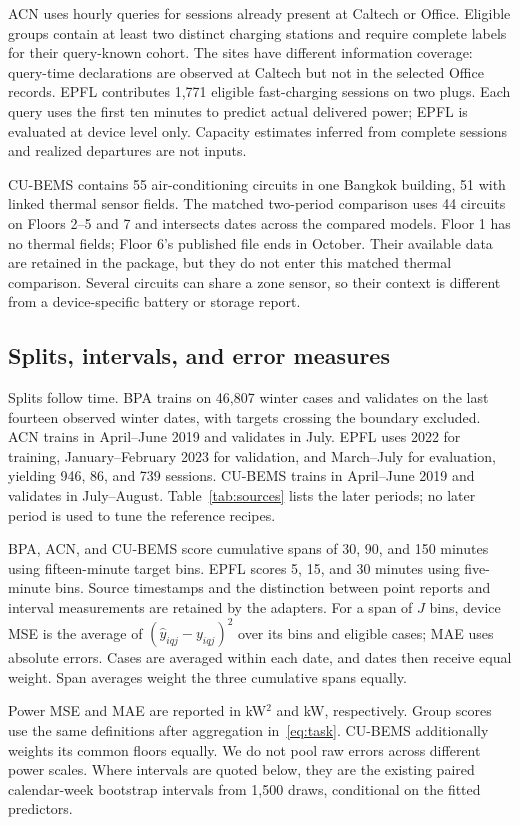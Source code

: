 \documentclass[conference,a4paper]{IEEEtran}
\begin{document}
ACN uses hourly queries for sessions already present at Caltech or Office.
Eligible groups contain at least two distinct charging stations and require
complete labels for their query-known cohort. The sites have different
information coverage: query-time declarations are observed at Caltech but
not in the selected Office records. EPFL contributes 1,771 eligible
fast-charging sessions on two plugs. Each query uses the first ten minutes
to predict actual delivered power; EPFL is evaluated at device level only.
Capacity estimates inferred from complete sessions and realized departures
are not inputs.

CU-BEMS contains 55 air-conditioning circuits in one Bangkok building, 51
with linked thermal sensor fields. The matched two-period comparison uses
44 circuits on Floors 2--5 and 7 and intersects dates across the compared
models. Floor 1 has no thermal fields; Floor 6's published file ends in
October. Their available data are retained in the package, but they do not
enter this matched thermal comparison. Several circuits can share a zone
sensor, so their context is different from a device-specific battery or
storage report.

\subsection{Splits, intervals, and error measures}
Splits follow time. BPA trains on 46,807 winter cases and validates on the
last fourteen observed winter dates, with targets crossing the boundary
excluded. ACN trains in April--June 2019 and validates in July. EPFL uses
2022 for training, January--February 2023 for validation, and March--July
for evaluation, yielding 946, 86, and 739 sessions. CU-BEMS trains in
April--June 2019 and validates in July--August. Table~\ref{tab:sources}
lists the later periods; no later period is used to tune the reference recipes.

BPA, ACN, and CU-BEMS score cumulative spans of 30, 90, and 150 minutes
using fifteen-minute target bins. EPFL scores 5, 15, and 30 minutes using
five-minute bins. Source timestamps and the distinction between point
reports and interval measurements are retained by the adapters. For a span
of $J$ bins, device MSE is the average of
$(\widehat y_{iqj}-y_{iqj})^2$ over its bins and eligible cases; MAE uses
absolute errors. Cases are averaged within each date, and dates then receive
equal weight. Span averages weight the three cumulative spans equally.

Power MSE and MAE are reported in kW$^2$ and kW, respectively. Group scores
use the same definitions after aggregation in~\eqref{eq:task}. CU-BEMS
additionally weights its common floors equally. We do not pool raw errors
across different power scales. Where intervals are quoted below, they are
the existing paired calendar-week bootstrap intervals from 1,500 draws,
conditional on the fitted predictors.
\end{document}
